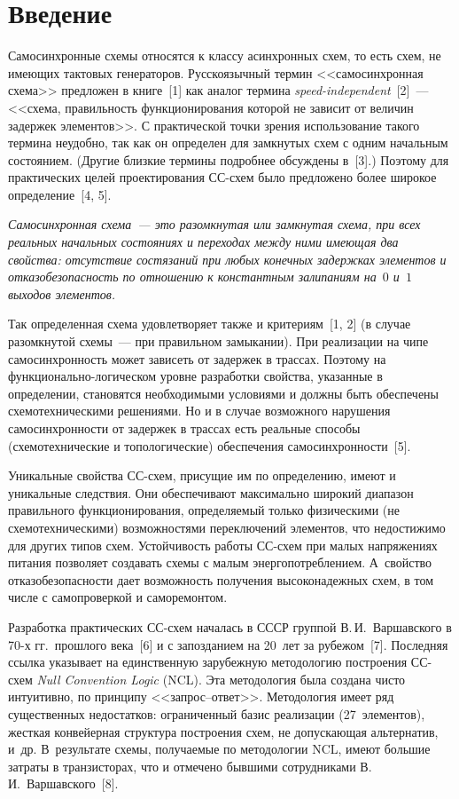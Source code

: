 \begin{multicols}{2}

\label{st\stat}


\section{Введение}

  Самосинхронные схемы относятся к классу асинхронных схем, то
есть схем, не име\-ющих тактовых генераторов. Русскоязычный термин
<<самосинхронная схема>> предложен в книге~[1] как аналог термина
  \textit{speed-independent}~[2]~--- <<схема, правильность функционирования
которой не зависит от величин задержек элементов>>. С практической точки
зрения использование такого термина неудобно, так как он определен для
замкнутых схем с одним начальным состоянием. (Другие близкие термины
подробнее обсуждены в~[3].) Поэтому для практических целей проектирования
СС-схем было предложено более широкое определение~[4, 5].

  \textit{Самосинхронная схема~--- это разомкнутая или замкнутая схема, при
всех реальных начальных состояниях и переходах между ними имеющая два
свойства: отсутствие состязаний при любых конечных задержках элементов и
отказобезопасность по отношению к константным залипаниям на~$0$ и~$1$
выходов элементов.}

  Так определенная схема удовлетворяет также и критериям~[1, 2] (в случае
разомкнутой схемы~--- при правильном замыкании). При реализации на чипе
самосинхронность может зависеть от задержек в трассах. Поэтому на
функционально-логическом уровне разработки свойства, указанные в
определении, становятся необходимыми условиями и должны быть обеспечены
схемотехническими решениями. Но и в случае возможного нарушения
самосинхронности от задержек в трассах есть реальные способы
(схемотехнические и топологические) обеспечения самосинхронности~[5].

  Уникальные свойства СС-схем, присущие им по определению, имеют и
уникальные следствия. Они обеспечивают максимально широкий диапазон
правильного функционирования, опреде\-ля\-емый только физическими (не
схемотехническими) возможностями переключений элементов, что
недостижимо для других типов схем. Устойчивость работы СС-схем при малых
напряжениях питания позволяет создавать схемы с малым энер\-го\-по\-треб\-ле\-ни\-ем.
А~свойство отказобезопасности дает возможность получения высоконадежных
схем, в том числе с самопроверкой и саморемонтом.

  Разработка практических СС-схем началась в СССР группой
В.\,И.~Варшавского в 70-х гг.\ прошлого века~[6] и с запозданием на 20~лет
за рубежом~[7].\linebreak
%
  Последняя ссылка указывает на единственную зарубежную методологию
построения СС-схем \textit{Null Convention Logic} (NCL). Эта методология была
\mbox{создана} чисто интуитивно, по принципу <<запрос--от\-вет>>. Методология имеет
ряд существенных недостат\-ков: ограниченный базис реализации
(27~элементов), жесткая конвейерная структура по\-стро\-ения схем, не
допускающая альтернатив, и~др. В~результате схемы, получаемые по
методологии NCL, имеют большие затраты в транзисторах, что и отмечено
бывшими сотрудниками В.\,И.~Варшавского~[8].


\end{multicols}

